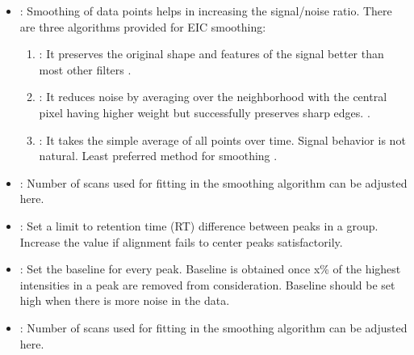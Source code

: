\documentclass[letterpaper,10pt,english,openany,oneside]{sphinxmanual}
\begin{document}
\begin{itemize}
\item {} 
: Smoothing of data points helps in increasing the signal/noise ratio. There are three algorithms provided for EIC smoothing:
\begin{enumerate}
\item {} 
: It preserves the original shape and features of the signal better than most other filters .

\item {} 
: It reduces noise by averaging over the neighborhood with the central pixel having higher weight but successfully preserves sharp edges. .

\item {} 
: It takes the simple average of all points over time. Signal behavior is not natural. Least preferred method for smoothing .

\end{enumerate}

\item {} 
: Number of scans used for fitting in the smoothing algorithm can be adjusted here.

\item {} 
: Set a limit to retention time (RT) difference between peaks in a group. Increase the value if alignment fails to center peaks satisfactorily.

\end{itemize}

\begin{itemize}
\item {} 
: Set the baseline for every peak. Baseline is obtained once x\% of the highest intensities in a peak are removed from consideration. Baseline should be set high when there is more noise in the data.

\item {} 
: Number of scans used for fitting in the smoothing algorithm can be adjusted here.

\end{itemize}
\end{document}
